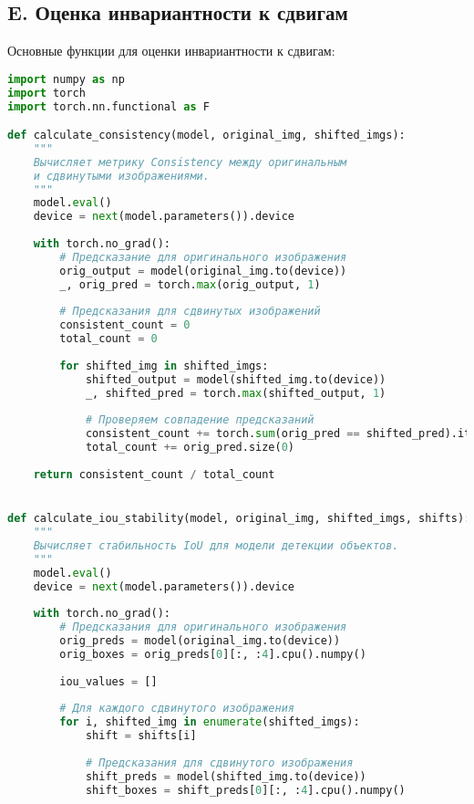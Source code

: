 \subsection*{E. Оценка инвариантности к сдвигам}
\label{appendix:evaluation_code}

Основные функции для оценки инвариантности к сдвигам:

\begin{lstlisting}[language=Python]
import numpy as np
import torch
import torch.nn.functional as F

def calculate_consistency(model, original_img, shifted_imgs):
    """
    Вычисляет метрику Consistency между оригинальным 
    и сдвинутыми изображениями.
    """
    model.eval()
    device = next(model.parameters()).device
    
    with torch.no_grad():
        # Предсказание для оригинального изображения
        orig_output = model(original_img.to(device))
        _, orig_pred = torch.max(orig_output, 1)
        
        # Предсказания для сдвинутых изображений
        consistent_count = 0
        total_count = 0
        
        for shifted_img in shifted_imgs:
            shifted_output = model(shifted_img.to(device))
            _, shifted_pred = torch.max(shifted_output, 1)
            
            # Проверяем совпадение предсказаний
            consistent_count += torch.sum(orig_pred == shifted_pred).item()
            total_count += orig_pred.size(0)
    
    return consistent_count / total_count


def calculate_iou_stability(model, original_img, shifted_imgs, shifts):
    """
    Вычисляет стабильность IoU для модели детекции объектов.
    """
    model.eval()
    device = next(model.parameters()).device
    
    with torch.no_grad():
        # Предсказания для оригинального изображения
        orig_preds = model(original_img.to(device))
        orig_boxes = orig_preds[0][:, :4].cpu().numpy()
        
        iou_values = []
        
        # Для каждого сдвинутого изображения
        for i, shifted_img in enumerate(shifted_imgs):
            shift = shifts[i]
            
            # Предсказания для сдвинутого изображения
            shift_preds = model(shifted_img.to(device))
            shift_boxes = shift_preds[0][:, :4].cpu().numpy()
            

\end{lstlisting}
